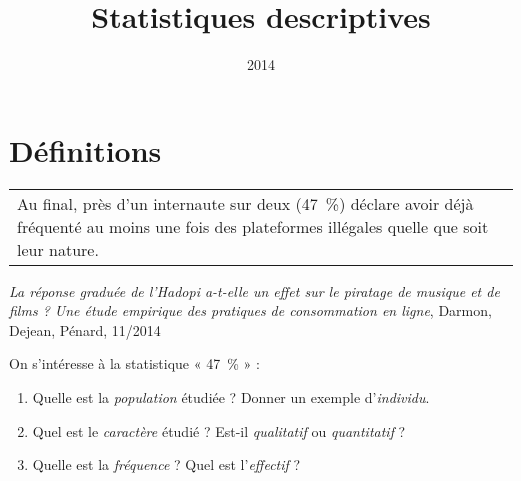 \documentclass[12pt, aspectratio=34]{beamer}
\institute{Lycée Marie Curie}
\date{2014}
\title{Statistiques descriptives}
\begin{document}
\section{Définitions}
\begin{frame}
  \begin{tabularx}{\textwidth}{||X}
    Au final, près d’un internaute sur deux (47~\%) déclare avoir déjà
    fréquenté au moins une fois des plateformes illégales quelle que soit
    leur nature.
  \end{tabularx}
    \begin{flushright}
      \begin{em}
        \small \emph{La réponse graduée de l’Hadopi a-t-elle un effet sur le
          piratage de musique et de films ? Une étude empirique
        des pratiques de consommation en ligne}, Darmon, Dejean, Pénard, 11/2014
      \end{em}
    \end{flushright}

    \vfill

  On s'intéresse à la statistique « 47~\% » :
  \begin{enumerate}
    \item Quelle est la \emph{population} étudiée ? Donner un exemple d'\emph{individu}.
    \item Quel est le \emph{caractère} étudié ? Est-il \emph{qualitatif} ou \emph{quantitatif} ?
    \item Quelle est la \emph{fréquence} ? Quel est l'\emph{effectif} ?
  \end{enumerate}

\end{frame}
\end{document}
